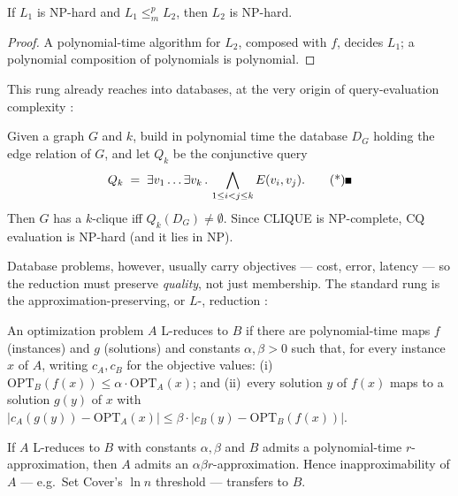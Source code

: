\begin{proposition}\label{prop:red-hardness}
If $L_1$ is NP-hard and $L_1 \le_m^p L_2$, then $L_2$ is NP-hard. \eop
\end{proposition}

\begin{proof}
A polynomial-time algorithm for $L_2$, composed with $f$, decides $L_1$; a polynomial
composition of polynomials is polynomial.
\end{proof}

This rung already reaches into databases, at the very origin of query-evaluation
complexity \citep{reduction-bg6}:

\begin{example}\label{ex:red-cq}
Given a graph $G$ and $k$, build in polynomial time the database $D_G$ holding the edge
relation of $G$, and let $Q_k$ be the conjunctive query
\[
Q_k \;=\; \exists v_1 \dots \exists v_k \,.\,
\bigwedge_{1 \le i < j \le k} E(v_i, v_j). \eopm
\]
Then $G$ has a $k$-clique iff $Q_k(D_G) \ne \emptyset$. Since CLIQUE is NP-complete,
CQ evaluation is NP-hard (and it lies in NP).
\end{example}

Database problems, however, usually carry objectives --- cost, error, latency --- so the
reduction must preserve \emph{quality}, not just membership. The standard rung is the
approximation-preserving, or $L$-, reduction \citep{reduction-bg4,reduction-bg1}:

\begin{definition}[$L$-reduction]\label{def:red-lred}
An optimization problem $A$ L-reduces to $B$ if there are polynomial-time maps $f$
(instances) and $g$ (solutions) and constants $\alpha, \beta > 0$ such that, for every
instance $x$ of $A$, writing $c_A, c_B$ for the objective values:
(i)~$\mathrm{OPT}_B(f(x)) \le \alpha \cdot \mathrm{OPT}_A(x)$; and
(ii)~every solution $y$ of $f(x)$ maps to a solution $g(y)$ of $x$ with
$|c_A(g(y)) - \mathrm{OPT}_A(x)| \le \beta \cdot |c_B(y) - \mathrm{OPT}_B(f(x))|$.
\eop
\end{definition}

\begin{proposition}\label{prop:red-ratio}
If $A$ L-reduces to $B$ with constants $\alpha,\beta$ and $B$ admits a polynomial-time
$r$-approximation, then $A$ admits an $\alpha\beta r$-approximation. Hence
inapproximability of $A$ --- e.g.\ Set Cover's $\ln n$ threshold --- transfers to $B$.
\eop
\end{proposition}

